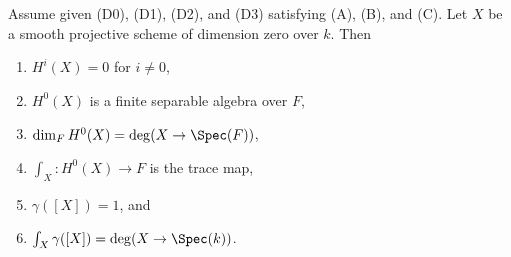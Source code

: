 \begin{lemma}
\label{lemma-dim-0}
Assume given (D0), (D1), (D2), and (D3) satisfying (A), (B), and (C).
Let $X$ be a smooth projective scheme of dimension zero over $k$.
Then
\begin{enumerate}
\item $H^i(X) = 0$ for $i \not = 0$,
\item $H^0(X)$ is a finite separable algebra over $F$,
\item $\dim_F H^0(X) = \deg(X \to \Spec(F))$,
\item $\int_X : H^0(X) \to F$ is the trace map,
\item $\gamma([X]) = 1$, and
\item $\int_X \gamma([X]) = \deg(X \to \Spec(k))$.
\end{enumerate}
\end{lemma}

